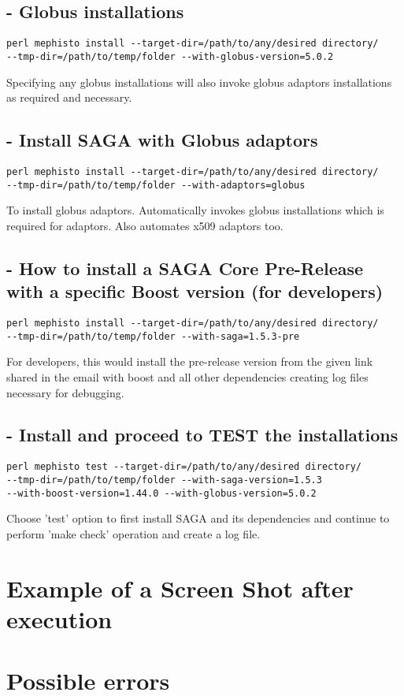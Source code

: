\documentclass[a4paper,10pt]{article}
\begin{document}
\subsection*{- Globus installations}
\begin{verbatim}
perl mephisto install --target-dir=/path/to/any/desired directory/ 
--tmp-dir=/path/to/temp/folder --with-globus-version=5.0.2
\end{verbatim}
Specifying any globus installations will also invoke globus adaptors
installations as required and necessary. 
\subsection*{- Install SAGA with Globus adaptors}
\begin{verbatim}
perl mephisto install --target-dir=/path/to/any/desired directory/ 
--tmp-dir=/path/to/temp/folder --with-adaptors=globus
\end{verbatim}
To install globus adaptors. Automatically invokes globus installations which 
is required for adaptors. Also automates x509 adaptors too. 
\subsection*{- How to install a SAGA Core Pre-Release with a specific Boost version (for developers)}
\begin{verbatim}
perl mephisto install --target-dir=/path/to/any/desired directory/ 
--tmp-dir=/path/to/temp/folder --with-saga=1.5.3-pre
\end{verbatim}
For developers, this would install the pre-release version from the given 
link shared in the email with boost and all other dependencies creating log 
files necessary for debugging. 
\subsection*{- Install and proceed to TEST the installations}
\begin{verbatim}
perl mephisto test --target-dir=/path/to/any/desired directory/ 
--tmp-dir=/path/to/temp/folder --with-saga-version=1.5.3 
--with-boost-version=1.44.0 --with-globus-version=5.0.2
\end{verbatim}
Choose 'test' option to first install SAGA and its dependencies and continue
to perform 'make check' operation and create a log file. 
\section*{Example of a Screen Shot after execution}
\section*{Possible errors} 



% 
%  
% 
\end{document}
